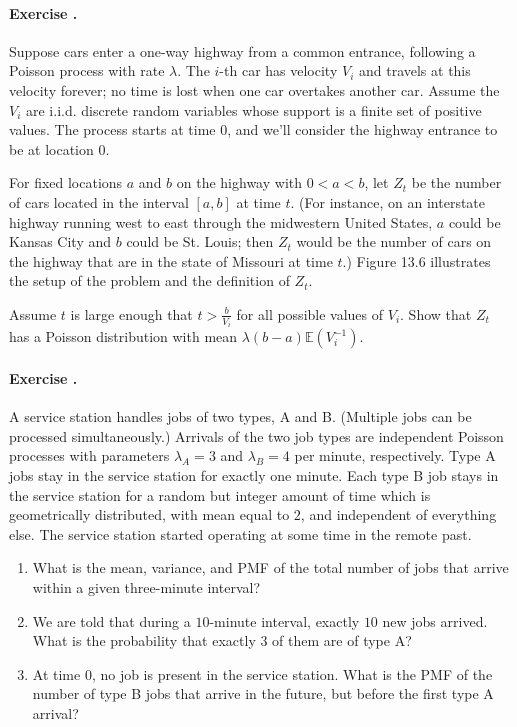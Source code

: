 \documentclass[twocolumn,12pt,a4paper]{article}
\newcounter{num}  %
\begin{document}
\paragraph{Exercise \thenum.}
		Suppose cars enter a one-way highway from a common entrance, following a Poisson process with rate $\lambda$. The $i$-th car has velocity $V_i$ and travels at this velocity forever; no time is lost when one car overtakes another car. Assume the $V_i$ are i.i.d. discrete random variables whose support is a finite set of positive values. The process starts at time 0, and we'll consider the highway entrance to be at location 0.
		
		For fixed locations $a$ and $b$ on the highway with $0 < a < b$, let $Z_t$ be the number of cars located in the interval $[a, b]$ at time $t$. (For instance, on an interstate highway running west to east through the midwestern United States, $a$ could be Kansas City and $b$ could be St. Louis; then $Z_t$ would be the number of cars on the highway that are in the state of Missouri at time $t$.) Figure 13.6 illustrates the setup of the problem and the definition of $Z_t$.
		
		Assume $t$ is large enough that $t > \frac{b}{V_i}$ for all possible values of $V_i$. Show that $Z_t$ has a Poisson distribution with mean $\lambda(b - a) \mathbb{E}(V_i^{-1})$.
		
	
\paragraph{Exercise \thenum.}
		A service station handles jobs of two types, A and B. (Multiple jobs can be processed simultaneously.) Arrivals of the two job types are independent Poisson processes with parameters $\lambda_A = 3$ and $\lambda_B = 4$ per minute, respectively. Type A jobs stay in the service station for exactly one minute. Each type B job stays in the service station for a random but integer amount of time which is geometrically distributed, with mean equal to $2$, and independent of everything else. The service station started operating at some time in the remote past.
		
		\begin{enumerate}
			\item What is the mean, variance, and PMF of the total number of jobs that arrive within a given three-minute interval?
			\item We are told that during a $10$-minute interval, exactly $10$ new jobs arrived. What is the probability that exactly $3$ of them are of type A?
			\item At time 0, no job is present in the service station. What is the PMF of the number of type B jobs that arrive in the future, but before the first type A arrival?
		\end{enumerate}
		
\end{document}
